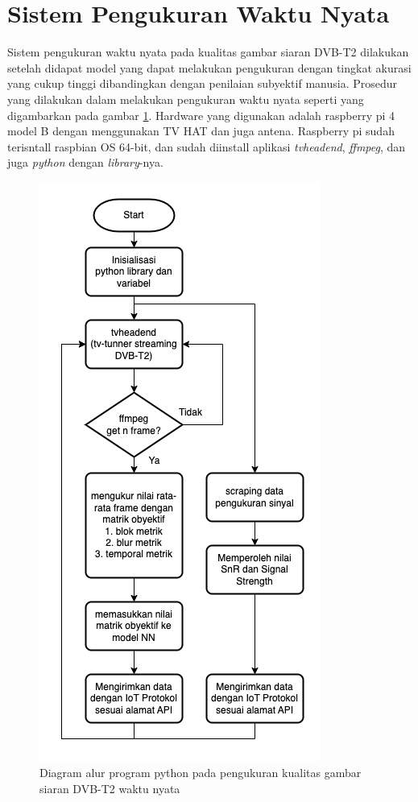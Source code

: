 \section{Sistem Pengukuran Waktu Nyata}
\hspace{1.2cm}
Sistem pengukuran waktu nyata pada kualitas gambar siaran DVB-T2 dilakukan setelah didapat model yang dapat melakukan pengukuran dengan tingkat akurasi yang cukup tinggi dibandingkan dengan penilaian subyektif manusia. Prosedur yang dilakukan dalam melakukan pengukuran waktu nyata seperti yang digambarkan pada gambar \ref{realtime-measurement}. Hardware yang digunakan adalah raspberry pi 4 model B dengan menggunakan TV HAT dan juga antena. Raspberry pi sudah terisntall raspbian OS 64-bit, dan sudah diinstall aplikasi \textit{tvheadend}, \textit{ffmpeg}, dan juga \textit{python} dengan \textit{library}-nya.

\begin{figure}[H]
	\vspace{-0.1cm}
	\begin{center}
		\includegraphics[width=0.6\columnwidth]{bab3/Gambar/realtime-measurement.png}
	\end{center}
	\vspace{-0.2cm}
	\caption{Diagram alur program python pada pengukuran kualitas gambar siaran DVB-T2 waktu nyata}
	\label{realtime-measurement}
\end{figure}

